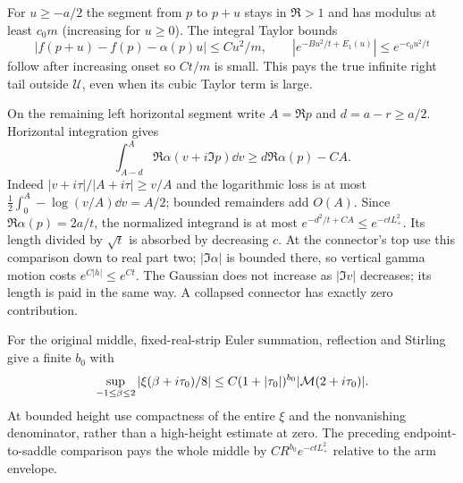 For $u\ge-a/2$ the segment from $p$ to $p+u$ stays in $\Re>1$
and has modulus at least $c_0m$ (increasing for $u\ge0$).
The integral Taylor bounds
\[
 |f(p+u)-f(p)-\alpha(p)u|\le Cu^2/m,
 \qquad |e^{-Bu^2/t+E_1(u)}|\le e^{-c_0u^2/t}
\]
follow after increasing onset so $Ct/m$ is small. This pays the
true infinite right tail outside $\mathcal U$, even when its cubic
Taylor term is large.

On the remaining left horizontal segment write $A=\Re p$ and
$d=a-r\ge a/2$. Horizontal integration gives
\[
 \int_{A-d}^A\Re\alpha(v+i\Im p)\dd v
 \ge d\Re\alpha(p)-CA.
\]
Indeed $|v+i\tau|/|A+i\tau|\ge v/A$ and the logarithmic loss
is at most $\tfrac12\int_0^A-\log(v/A)\dd v=A/2$; bounded
remainders add $O(A)$. Since $\Re\alpha(p)=2a/t$, the normalized
integrand is at most $e^{-d^2/t+CA}\le e^{-ctL_+^2}$.
Its length divided by $\sqrt t$ is absorbed by decreasing $c$.
At the connector's top use this comparison down to real part two;
$|\Im\alpha|$ is bounded there, so vertical gamma motion costs
$e^{C|h|}\le e^{Ct}$. The Gaussian does not increase as $|\Im v|$
decreases; its length is paid in the same way. A collapsed connector
has exactly zero contribution.

For the original middle, fixed-real-strip Euler summation, reflection
and Stirling give a finite $b_0$ with
\[
 \sup_{-1\le\beta\le2}|\xi(\beta+i\tau_0)/8|
 \le C(1+|\tau_0|)^{b_0}|\mathcal M(2+i\tau_0)|.
\]
At bounded height use compactness of the entire $\xi$ and the
nonvanishing denominator, rather than a high-height estimate at zero.
The preceding endpoint-to-saddle comparison pays the whole middle by
$CR^{b_0}e^{-ctL_+^2}$ relative to the arm envelope.

